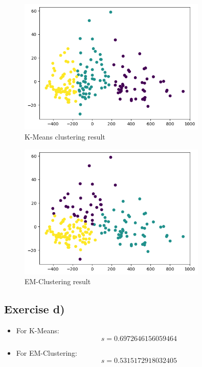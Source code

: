 \documentclass{article}
\begin{document}
\begin{figure}[h]
    \centering
    \includegraphics[width=0.8\textwidth]{output1.png}
    \caption{K-Means clustering result}
\end{figure}

\begin{figure}[h]
    \centering
    \includegraphics[width=0.8\textwidth]{output2.png}
    \caption{EM-Clustering result}
\end{figure}

\newpage
\subsection{Exercise d)}

\begin{itemize}
    \item For K-Means: 
    \[
    s = 0.6972646156059464
    \]
    
    \item For EM-Clustering: 
    \[
    s = 0.5315172918032405
    \]
\end{itemize}
\end{document}
